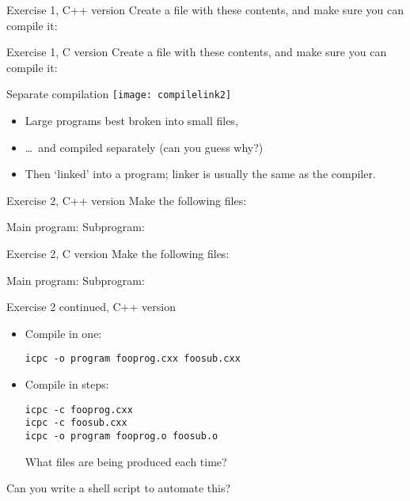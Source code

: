 \documentclass[11pt,headernav]{beamer}
\begin{document}
\begin{numberedframe}{Exercise 1, C++ version}
  Create a file with these contents, and make sure you can compile it:
  
\end{numberedframe}

\begin{numberedframe}{Exercise 1, C version}
  Create a file with these contents, and make sure you can compile it:
  
\end{numberedframe}

\begin{numberedframe}{Separate compilation}
  \label{sl-tut:compile2}
  \texttt{[image: compilelink2]}
  \begin{itemize}
  \item Large programs best broken into small files,
  \item \ldots~and compiled separately (can you guess why?)
  \item Then `linked' into a program; linker is usually the same as the compiler.
  \end{itemize}
\end{numberedframe}

\begin{numberedframe}{Exercise 2, C++ version}
  \label{sl-tut:compile3cxx}
\begingroup \footnotesize
Make the following files:
\begin{multicols}{2}
  Main program: 
  \columnbreak
  Subprogram: 
\end{multicols}
\endgroup
\end{numberedframe}

\begin{numberedframe}{Exercise 2, C version}
  \label{sl-tut:compile3c}
\begingroup \footnotesize
Make the following files:
\begin{multicols}{2}
  Main program: 
  \columnbreak
  Subprogram: 
\end{multicols}
\endgroup
\end{numberedframe}

\begin{numberedframe}{Exercise 2 continued, C++ version}
  \begin{itemize}
  \item Compile in one:
\begin{verbatim}
icpc -o program fooprog.cxx foosub.cxx
\end{verbatim}
\item Compile in steps:
\begin{verbatim}
icpc -c fooprog.cxx
icpc -c foosub.cxx
icpc -o program fooprog.o foosub.o
\end{verbatim}
What files are being produced each time?
  \end{itemize}
Can you write a shell script to automate this?  
\end{numberedframe}
\end{document}
